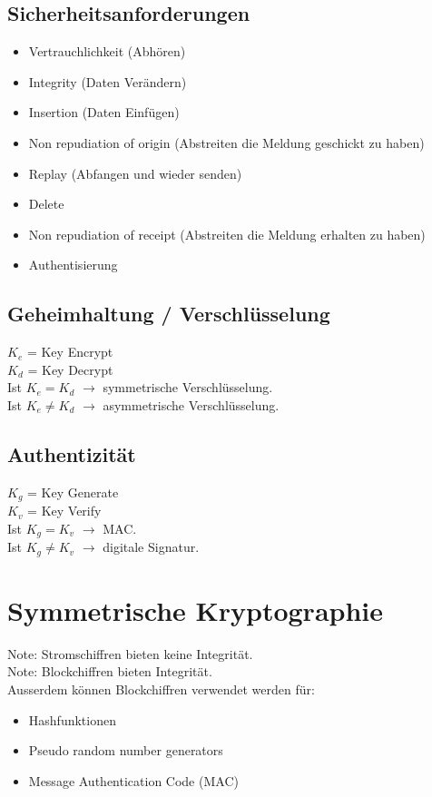 \documentclass[12pt]{scrartcl}
\begin{document}
\subsection{Sicherheitsanforderungen}

\begin{itemize}
    \item Vertrauchlichkeit (Abhören)
    \item Integrity (Daten Verändern)
    \item Insertion (Daten Einfügen)
    \item Non repudiation of origin (Abstreiten die Meldung geschickt zu haben)
    \item Replay (Abfangen und wieder senden)
    \item Delete 
    \item Non repudiation of receipt (Abstreiten die Meldung erhalten zu haben)
    \item Authentisierung
\end{itemize}

\subsection{Geheimhaltung / Verschlüsselung}


$K_e$ = Key Encrypt \\
$K_d$ = Key Decrypt \\


Ist $K_e = K_d$ $\rightarrow$ symmetrische Verschlüsselung.\\
Ist $K_e \neq K_d$ $\rightarrow$ asymmetrische Verschlüsselung.


\subsection{Authentizität}

$K_g$ = Key Generate \\
$K_v$ = Key Verify \\

Ist $K_g = K_v$ $\rightarrow$ MAC.\\
Ist $K_g \neq K_v$ $\rightarrow$ digitale Signatur.


\newpage
\label{sec:symmetrische_kryptographie}
\section{Symmetrische Kryptographie}

Note: Stromschiffren bieten keine Integrität.\\
Note: Blockchiffren bieten Integrität.\\
Ausserdem können Blockchiffren verwendet werden für:
\begin{itemize}
    \item Hashfunktionen
    \item Pseudo random number generators
    \item Message Authentication Code (MAC)
\end{itemize}
\end{document}
